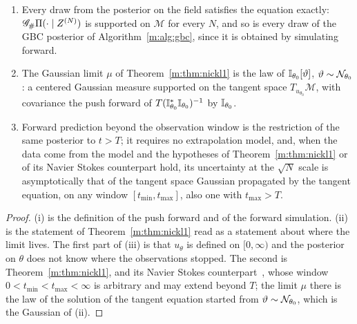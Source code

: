 \begin{proposition}\label{m:prop:manifold}
\begin{enumerate}[label=(\roman*)]
\item Every draw from the posterior on the field satisfies the equation exactly: $\mathscr{G}_\#\Pi(\cdot\mid Z^{(N)})$ is supported on $\mathcal M$ for every $N$, and so is every draw of the GBC posterior of Algorithm~\ref{m:alg:gbc}, since it is obtained by simulating forward.
\item The Gaussian limit $\mu$ of Theorem~\ref{m:thm:nickl1} is the law of $\mathbb{I}_{\theta_0}[\vartheta]$, $\vartheta\sim\mathcal{N}_{\theta_0}$: a centered Gaussian measure supported on the tangent space $T_{u_{\theta_0}}\mathcal M$, with covariance the push forward of $T(\mathbb{I}^*_{\theta_0}\mathbb{I}_{\theta_0})^{-1}$ by $\mathbb{I}_{\theta_0}$.
\item Forward prediction beyond the observation window is the restriction of the same posterior to $t>T$; it requires no extrapolation model, and, when the data come from the model and the hypotheses of Theorem~\ref{m:thm:nickl1} or of its Navier Stokes counterpart hold, its uncertainty at the $\sqrt N$ scale is asymptotically that of the tangent space Gaussian propagated by the tangent equation, on any window $[t_{\min},t_{\max}]$, also one with $t_{\max}>T$.
\end{enumerate}
\end{proposition}

\begin{proof}
(i) is the definition of the push forward and of the forward simulation. (ii) is the statement of Theorem~\ref{m:thm:nickl1} read as a statement about where the limit lives. The first part of (iii) is that $u_\theta$ is defined on $[0,\infty)$ and the posterior on $\theta$ does not know where the observations stopped. The second is Theorem~\ref{m:thm:nickl1}, and its Navier Stokes counterpart~\cite{konennickl2026}, whose window $0<t_{\min}<t_{\max}<\infty$ is arbitrary and may extend beyond $T$; the limit $\mu$ there is the law of the solution of the tangent equation started from $\vartheta\sim\mathcal{N}_{\theta_0}$, which is the Gaussian of (ii).
\end{proof}

